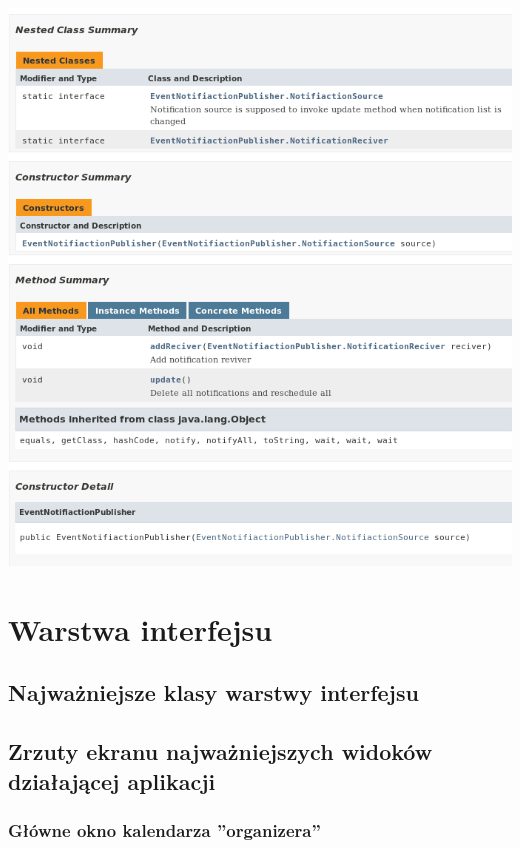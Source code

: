 \documentclass[a4paper,12pt]{article}
\begin{document}
\begin{minipage}{\textwidth}

    \includegraphics[width=\textwidth]{./screen/logicLayer/EventNotificationPublisher.png}
    \label{LogicLayerFactory}

\end{minipage}

\section{Warstwa interfejsu}
\subsection{Najważniejsze klasy warstwy interfejsu}
\subsection{Zrzuty ekranu najważniejszych widoków działającej aplikacji}
\subsubsection{Główne okno kalendarza ''organizera''}
\end{document}
